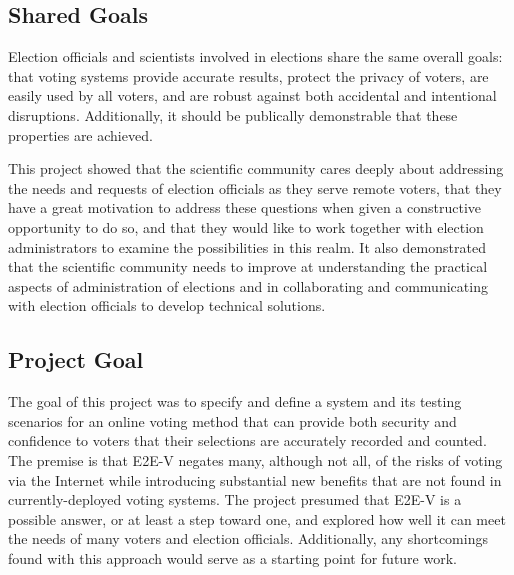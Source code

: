 \subsection{Shared Goals}
\label{sec:shared-goals}

Election officials and scientists involved in elections share the same
overall goals: that voting systems provide accurate results, protect
the privacy of voters, are easily used by all voters, and are robust
against both accidental and intentional disruptions. Additionally, it
should be publically demonstrable that these properties are achieved.

This project showed that the scientific community cares deeply about
addressing the needs and requests of election officials as they serve
remote voters, that they have a great motivation to address these
questions when given a constructive opportunity to do so, and that
they would like to work together with election administrators to examine 
the possibilities in this realm. It also demonstrated that the scientific 
community needs to improve at understanding the practical aspects of 
administration of elections and in collaborating and communicating with 
election officials to develop technical solutions. 


\subsection{Project Goal}
\label{sec:project-goal}

The goal of this project was to specify and define a system and its
testing scenarios for an online voting method that can provide both
security and confidence to voters that their selections are accurately
recorded and counted. The premise is that E2E-V negates many, although 
not all, of the risks of voting via the Internet while introducing 
substantial new benefits that are not found in currently-deployed voting 
systems. The project presumed that E2E-V is a possible answer, or at least 
a step toward one, and explored how well it can meet the needs of many voters 
and election officials. Additionally, any shortcomings found with this approach
would serve as a starting point for future work.

